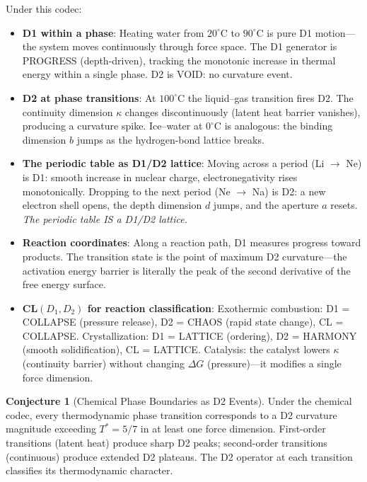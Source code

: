 \documentclass[11pt]{article}
\theoremstyle{definition}
\newtheorem{conjecture}[theorem]{Conjecture}
\theoremstyle{remark}
\begin{document}
Under this codec:
\begin{itemize}[nosep]
  \item \textbf{D1 within a phase}: Heating water from $20^{\circ}$C to $90^{\circ}$C
    is pure D1 motion---the system moves continuously through force space.  The
    D1 generator is PROGRESS (depth-driven), tracking the monotonic increase in
    thermal energy within a single phase.  D2 is VOID: no curvature event.
  \item \textbf{D2 at phase transitions}: At $100^{\circ}$C the liquid--gas
    transition fires D2.  The continuity dimension $\kappa$ changes
    discontinuously (latent heat barrier vanishes), producing a curvature
    spike.  Ice--water at $0^{\circ}$C is analogous: the binding dimension $b$
    jumps as the hydrogen-bond lattice breaks.
  \item \textbf{The periodic table as D1/D2 lattice}: Moving across a period
    (Li $\to$ Ne) is D1: smooth increase in nuclear charge, electronegativity
    rises monotonically.  Dropping to the next period (Ne $\to$ Na) is D2:
    a new electron shell opens, the depth dimension $d$ jumps, and the
    aperture $a$ resets.  \emph{The periodic table IS a D1/D2 lattice.}
  \item \textbf{Reaction coordinates}: Along a reaction path, D1 measures
    progress toward products.  The transition state is the point of maximum
    D2 curvature---the activation energy barrier is literally the peak of
    the second derivative of the free energy surface.
  \item \textbf{CL$(D_1, D_2)$ for reaction classification}:
    Exothermic combustion: D1 = COLLAPSE (pressure release), D2 = CHAOS
    (rapid state change), CL = COLLAPSE.
    Crystallization: D1 = LATTICE (ordering), D2 = HARMONY (smooth
    solidification), CL = LATTICE.
    Catalysis: the catalyst lowers $\kappa$ (continuity barrier) without
    changing $\Delta G$ (pressure)---it modifies a single force dimension.
\end{itemize}

\begin{conjecture}[Chemical Phase Boundaries as D2 Events]
\label{conj:chem-phase}
Under the chemical codec, every thermodynamic phase transition corresponds
to a D2 curvature magnitude exceeding $T^{*} = 5/7$ in at least one force
dimension.  First-order transitions (latent heat) produce sharp D2 peaks;
second-order transitions (continuous) produce extended D2 plateaus.  The
D2 operator at each transition classifies its thermodynamic character.
\end{conjecture}
\end{document}
